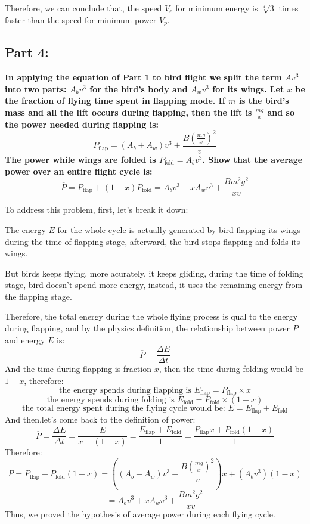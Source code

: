\documentclass{article}
\begin{document}
Therefore, we can conclude that, the speed \(V_e\) for minimum energy is \(\sqrt[4]{3}\) times faster than the speed for minimum power \(V_p\).

\subsection*{Part 4:}
\label{sec:part4}
{\large \bfseries In applying the equation of Part 1 to bird flight we split the term \(Av^3\)into two
parts: \(A_bv^3\) for the bird’s body and \(A_wv^3\) for its wings. Let \(x\) be the fraction of flying time spent in flapping mode. If \(m\) is the bird’s mass and all the lift occurs during flapping, then the lift is \(\frac{mg}{x}\) and so the power needed during flapping is:
\[P_\text{flap} = (A_b+A_w)v^3+\frac{B(\frac{mg}{x})^2}{v}\]
The power while wings are folded is \(P_\text{fold}=A_bv^3\). Show that the average power over an entire flight cycle is:
\[\overline{P}=P_\text{flap}+(1-x)P_\text{fold} = A_bv^3+xA_wv^3+\frac{Bm^2g^2}{xv}\]}

To address this problem, first, let's break it down:

 The energy \(E\) for the whole cycle is actually generated by bird flapping its wings during the time of flapping stage, afterward, the bird stops flapping and folds its wings.

 But birds keeps flying, more acurately, it keeps gliding, during the time of folding stage, bird doesn't spend more energy, instead, it uses the remaining energy from the flapping stage.

Therefore, the total energy during the whole flying process is qual to the energy during flapping, and by the physics definition, the relationship between power \(P\) and energy \(E\) is:
\[\overline{P}=\frac{\Delta E}{\Delta t}\]
And the time during flapping is fraction \(x\), then the time during folding would be \(1-x\), therefore:
\[\text{the energy spends during flapping is } E_\text{flap} =P_\text{flap}\times  x \]
\[\text{the energy spends during folding is } E_\text{fold} = P_\text{fold}\times (1-x)\] 
\[\text{the total energy spent during the flying cycle would be: }E = E_\text{flap} +E_\text{fold} \]
And then,let's come back to the definition of power:
 \[\overline{P}=\frac{\Delta E}{\Delta t}=\frac{E}{x+(1-x)}=\frac{E_\text{flap}+E_\text{fold}}{1}=\frac{P_\text{flap}x + P_\text{fold}(1-x)}{1}\]
 Therefore:
\[\overline{P}=P_\text{flap}+P_\text{fold}(1-x)=((A_b+A_w)v^3+\frac{B(\frac{mg}{x})^2}{v})x+(A_bv^3)(1-x)\] 
\[= A_bv^3+xA_wv^3+\frac{Bm^2g^2}{xv}\]
Thus, we proved the hypothesis of average power during each flying cycle.
\end{document}
